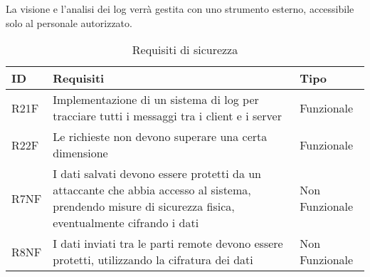 La visione e l'analisi dei log verrà gestita con uno strumento esterno, accessibile solo al personale autorizzato.


\begin{table}[htbp]
    \centering
    \begin{tabular} {|P{1.3cm}|P{11.2cm}|P{3cm}|}
        \hline
        \textbf{ID}                       & \textbf{Requisiti}                                                  & \textbf{Tipo} \\
        \hline
        R21F                              & Implementazione di un sistema di log per tracciare tutti i messaggi
        tra i client e i server           & Funzionale                                                                          \\
        \hline
        R22F                              & Le richieste non devono superare una certa dimensione               & Funzionale    \\
        \hline
        R7NF                              & I dati salvati devono essere protetti da un attaccante che abbia
        accesso al sistema, prendendo misure di sicurezza fisica, eventualmente
        cifrando i dati                   & Non Funzionale                                                                      \\
        \hline
        R8NF                              & I dati inviati tra le parti remote devono essere protetti, utilizzando la cifratura dei dati & Non Funzionale                                                                      \\
        \hline
    \end{tabular}
    \caption{Requisiti di sicurezza}
\end{table}

\clearpage